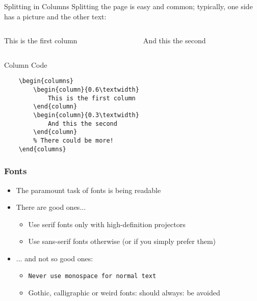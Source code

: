 \documentclass{beamer}
\begin{document}
\begin{frame}[fragile]{Splitting in Columns}
    Splitting the page is easy and common;
    typically, one side has a picture and the other text:
    \begin{columns}
        \begin{column}{0.6\textwidth}
            This is the first column
        \end{column}
        \begin{column}{0.3\textwidth}
            And this the second
        \end{column}
    \end{columns}
    \begin{block}{Column Code}
        \begin{verbatim}
    \begin{columns}
        \begin{column}{0.6\textwidth}
            This is the first column
        \end{column}
        \begin{column}{0.3\textwidth}
            And this the second
        \end{column}
        % There could be more!
    \end{columns}
    \end{verbatim}
    \end{block}
\end{frame}


\begin{frame}
    \frametitle{Fonts}
    \begin{itemize}
        \item The paramount task of fonts is being readable
        \item There are good ones...
              \begin{itemize}
                  \item {\textrm{Use serif fonts only with high-definition projectors}}
                  \item {\textsf{Use sans-serif fonts otherwise (or if you simply prefer
                            them)}}
              \end{itemize}
        \item ... and not so good ones:
              \begin{itemize}
                  \item {\texttt{Never use monospace for normal text}}
                  \item {\frakfamily Gothic, calligraphic or weird fonts: should always: be
                        avoided}
              \end{itemize}
    \end{itemize}
\end{frame}
\end{document}
